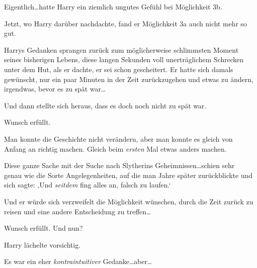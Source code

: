 Eigentlich…hatte Harry ein ziemlich ungutes Gefühl bei Möglichkeit 3b.

Jetzt, wo Harry darüber nachdachte, fand er Möglichkeit 3a auch nicht mehr so gut.

Harrys Gedanken sprangen zurück zum möglicherweise schlimmsten Moment seines bisherigen Lebens, diese langen Sekunden voll unerträglichem Schrecken unter dem Hut, als er dachte, er sei schon gescheitert. Er hatte sich damals gewünscht, nur ein paar Minuten in der Zeit zurückzugehen und etwas zu ändern, irgendwas, bevor es zu spät war…

Und dann stellte sich heraus, dass es doch noch nicht zu spät war.

Wunsch erfüllt.

Man konnte die Geschichte nicht verändern, aber man konnte es gleich von Anfang an richtig machen. Gleich beim \emph{ersten} Mal etwas anders machen.

Diese ganze Sache mit der Suche nach Slytherins Geheimnissen…schien sehr genau wie die Sorte Angelegenheiten, auf die man Jahre später zurückblickte und sich sagte: ‚Und \emph{seitdem} fing alles an, falsch zu laufen.‘

Und er würde sich verzweifelt die Möglichkeit wünschen, durch die Zeit zurück zu reisen und eine andere Entscheidung zu treffen…

Wunsch erfüllt. Und nun?

Harry lächelte vorsichtig.

Es war ein eher \emph{kontraintuitiver} Gedanke…aber…

